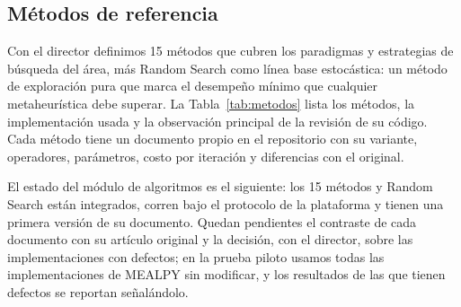 \documentclass[11pt,letterpaper]{article}
\begin{document}
\subsection{Métodos de referencia}

Con el director definimos 15 métodos que cubren los paradigmas y estrategias de búsqueda del área, más Random Search como línea base estocástica: un método de exploración pura que marca el desempeño mínimo que cualquier metaheurística debe superar. La Tabla~\ref{tab:metodos} lista los métodos, la implementación usada y la observación principal de la revisión de su código. Cada método tiene un documento propio en el repositorio con su variante, operadores, parámetros, costo por iteración y diferencias con el original.

El estado del módulo de algoritmos es el siguiente: los 15 métodos y Random Search están integrados, corren bajo el protocolo de la plataforma y tienen una primera versión de su documento. Quedan pendientes el contraste de cada documento con su artículo original y la decisión, con el director, sobre las implementaciones con defectos; en la prueba piloto usamos todas las implementaciones de MEALPY sin modificar, y los resultados de las que tienen defectos se reportan señalándolo.
\end{document}
